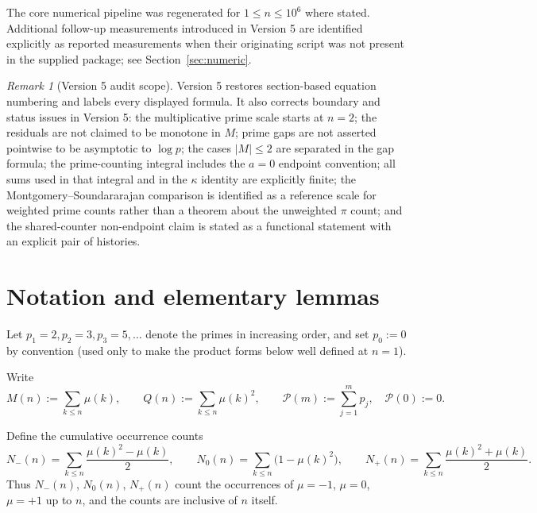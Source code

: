 \documentclass[11pt]{amsart}
\numberwithin{equation}{section}
\theoremstyle{plain}
\theoremstyle{definition}
\theoremstyle{remark}
\newtheorem{remark}[theorem]{Remark}
\newcommand{\mob}{\mu}
\newcommand{\Mert}{M}
\newcommand{\Sq}{Q}
\newcommand{\PS}{\mathcal P}
\begin{document}
The core numerical pipeline was regenerated for $1\le n\le10^{6}$ where stated.
Additional follow-up measurements introduced in Version 5 are identified explicitly as
reported measurements when their originating script was not present in the supplied
package; see Section~\ref{sec:numeric}.

\begin{remark}[Version 5 audit scope]
\label{rem:v5-audit}
Version 5 restores section-based equation numbering and labels every displayed
formula.  It also corrects boundary and status issues in Version 5: the
multiplicative prime scale starts at $n=2$; the residuals are not claimed to be
monotone in $M$; prime gaps are not asserted pointwise to be asymptotic to
$\log p$; the cases $|M|\le2$ are separated in the gap formula; the
prime-counting integral includes the $a=0$ endpoint convention; all sums used
in that integral and in the $\kappa$ identity are explicitly finite; the
Montgomery--Soundararajan comparison is identified as a reference scale for
weighted prime counts rather than a theorem about the unweighted $\pi$ count;
and the shared-counter non-endpoint claim is stated as a functional statement
with an explicit pair of histories.
\end{remark}

\section{Notation and elementary lemmas}
\label{sec:notation}

Let $p_1=2,p_2=3,p_3=5,\ldots$ denote the primes in increasing order, and set
$p_0:=0$ by convention (used only to make the product forms below well defined
at $n=1$).

Write
\begin{equation}
\label{eq:basic-definitions}
\Mert(n):=\sum_{k\le n}\mob(k),
\qquad
\Sq(n):=\sum_{k\le n}\mob(k)^2 ,
\qquad
\PS(m):=\sum_{j=1}^{m}p_j ,\quad \PS(0):=0 .
\end{equation}

Define the cumulative occurrence counts
\begin{equation}
\label{eq:occurrence-counts}
N_-(n)=\sum_{k\le n}\frac{\mob(k)^2-\mob(k)}2,
\qquad
N_0(n)=\sum_{k\le n}\bigl(1-\mob(k)^2\bigr),
\qquad
N_+(n)=\sum_{k\le n}\frac{\mob(k)^2+\mob(k)}2 .
\end{equation}
Thus $N_-(n)$, $N_0(n)$, $N_+(n)$ count the occurrences of $\mob=-1$, $\mob=0$,
$\mob=+1$ up to $n$, and the counts are inclusive of $n$ itself.
\end{document}
